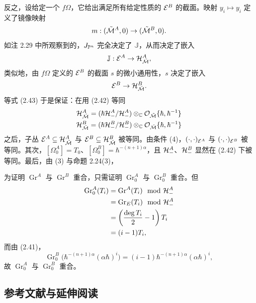 反之，设给定一个 $f\Omega$，它给出满足所有给定性质的 $\mathcal{E}^{B}$ 的截面。映射 $y_i\mapsto y_i$ 定义了镜像映射
\[
  m:(\tilde{\mathcal{M}}^{A},0)\to(\tilde{\mathcal{M}}^{B},0).
\]
如注 2.29 中所观察到的，$J_{\mathbb{P}^{n}}$ 完全决定了 $\mathbb{J}$，从而决定了嵌入
\[
  \mathbb{J}:\mathcal{E}^{A}\to\mathcal{H}^{A}_{\tilde{\mathcal{M}}},
\]
类似地，由 $f\Omega$ 定义的 $\mathcal{E}^{B}$ 的截面 $s$ 的微小通用性，$s$ 决定了嵌入
\[
  \mathcal{E}^{B}\to\mathcal{H}^{B}_{\tilde{\mathcal{M}}}.
\]
等式 (2.43) 于是保证：在用 (2.42) 等同
\[
  \begin{gathered}
    \mathcal{H}^{A}_{\tilde{\mathcal{M}}}=(\hbar\mathcal{H}^{A}_-/\mathcal{H}^{A}_-)\otimes_{\mathbb{C}}\mathcal{O}_{\tilde{\mathcal{M}}}\{\hbar,\hbar^{-1}\}\\
    \mathcal{H}^{B}_{\tilde{\mathcal{M}}}=(\hbar\mathcal{H}^{B}_-/\mathcal{H}^{B}_-)\otimes_{\mathbb{C}}\mathcal{O}_{\tilde{\mathcal{M}}}\{\hbar,\hbar^{-1}\}
  \end{gathered}
\]
之后，子丛 $\mathcal{E}^{A}\subseteq\mathcal{H}^{A}_{\tilde{\mathcal{M}}}$ 与 $\mathcal{E}^{B}\subseteq\mathcal{H}^{B}_{\tilde{\mathcal{M}}}$ 被等同。由条件 (4)，$(\cdot,\cdot)_{\mathcal{E}^{A}}$ 与 $(\cdot,\cdot)_{\mathcal{E}^{B}}$ 被等同。其次，$[\Omega^{A}_0]=T_0$、$[\Omega^{B}_0]=\hbar^{-(n+1)\alpha}$，且 $\mathcal{H}^{A}_-$、$\mathcal{H}^{B}_-$ 显然在 (2.42) 下被等同。最后，由 (3) 与命题 2.24(3)，


为证明 $\operatorname{Gr}^{A}$ 与 $\operatorname{Gr}^{B}$ 重合，只需证明 $\operatorname{Gr}^{A}_0$ 与 $\operatorname{Gr}^{B}_0$ 重合。但
\begin{align*}
  \operatorname{Gr}^{A}_0(T_i)
  &=\operatorname{Gr}^{A}(T_i)\mod{\mathcal{H}}^{A}_-\\
  &=\operatorname{Gr}_E(T_i)\mod{\mathcal{H}}^{A}_-\\
  &=\left(\frac{\deg T_i}{2}-1\right)T_i\\
  &=(i-1)T_i,
\end{align*}
而由 (2.41)，
\[
  \operatorname{Gr}^{B}_0\bigl(\hbar^{-(n+1)\alpha}(\alpha\hbar)^{i}\bigr)
  =(i-1)\hbar^{-(n+1)\alpha}(\alpha\hbar)^{i},
\]
故 $\operatorname{Gr}^{A}_0$ 与 $\operatorname{Gr}^{B}_0$ 重合。

\subsection{参考文献与延伸阅读}

